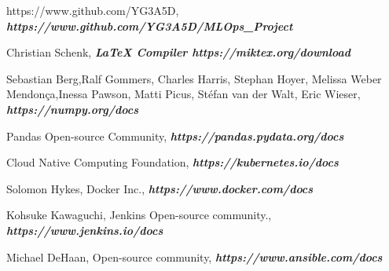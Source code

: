 \documentclass[12pt,oneside,a4paper]{report}
\begin{document}
\begin{thebibliography}{100}  %
 
 https://www.github.com/YG3A5D, \textbf{\emph{https://www.github.com/YG3A5D/MLOps\_Project}}
 
  Christian Schenk, \textbf{\emph{LaTeX Compiler https://miktex.org/download}}
 
 Sebastian Berg,Ralf Gommers, Charles Harris, Stephan Hoyer, Melissa Weber  Mendonça,Inessa Pawson, Matti Picus, Stéfan van der Walt, Eric Wieser, \textbf{ \emph{https://numpy.org/docs}} 

 Pandas Open-source Community, \textbf{ \emph{https://pandas.pydata.org/docs}} 
 
 Cloud Native Computing Foundation, \textbf{ \emph{https://kubernetes.io/docs}} 
 
 Solomon Hykes, Docker Inc., \textbf{\emph{https://www.docker.com/docs}}
 
  Kohsuke Kawaguchi, Jenkins Open-source community., \textbf{\emph{https://www.jenkins.io/docs}}

  Michael DeHaan, Open-source community, \textbf{\emph{https://www.ansible.com/docs}}
 
\end{thebibliography}
%
\end{document}
